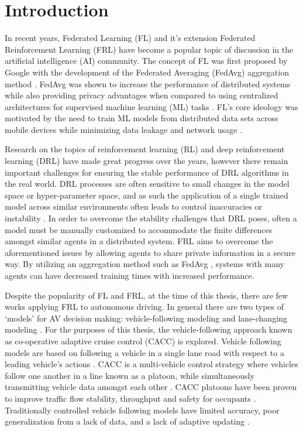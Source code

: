 \chapter{Introduction}
In recent years, Federated Learning (FL) and it's extension Federated Reinforcement Learning
(FRL) have become a popular topic of discussion in the artificial intelligence (AI)
community.  The concept of FL was first proposed by Google with the development of the
Federated Averaging (FedAvg) aggregation method \cite{McMahan2016FederatedLO}.
FedAvg was shown to increase the performance of distributed systems while also providing
privacy advantages when compared to using centralized architectures for supervised machine
learning (ML) tasks \cite{Konecny2015, BrendanMcMahan2017a, McMahan2016FederatedLO}.
FL's core ideology was motivated by the need to train ML models from distributed data sets
across mobile devices while minimizing data leakage and network usage
\cite{McMahan2016FederatedLO}.

Research on the topics of reinforcement learning (RL) and deep reinforcement learning (DRL)
have made great progress over the years, however there remain important challenges for
ensuring the stable performance of DRL algorithms in the real world. DRL processes are
often sensitive to small changes in the model space or hyper-parameter space, and as such
the application of a single trained model across similar environments often leads to control
inaccuracies or instability \cite{Yang2019a, Lim2020}.   In order to overcome the
stability challenges that DRL poses, often a model must be manually customized to
accommodate the finite differences amongst similar agents in a distributed system.
FRL aims to overcome the aforementioned issues by allowing agents to share private
information in a secure way.  By utilizing an aggregation method such as FedAvg
\cite{McMahan2016FederatedLO}, systems with many agents can have decreased training
times with increased performance.

Despite the popularity of FL and FRL, at the time of this thesis, there are few works applying FRL to autonomous
driving.  In general there are two types of `models' for AV decision making:
vehicle-following modeling and lane-changing modeling \cite{Ye2019}. For the purposes of
this thesis, the vehicle-following approach known as co-operative adaptive cruise control
(CACC) is explored. Vehicle following models are based on following a vehicle in a single
lane road with respect to a leading vehicle's actions \cite{Zhu2018}.  CACC is a
multi-vehicle control strategy where vehicles follow one another in a line known as a
platoon, while simultaneously transmitting vehicle data amongst each other \cite{Song2020}.
CACC platoons have been proven to improve traffic flow stability, throughput and safety
for occupants \cite{Song2020, Chu2019b}.  Traditionally controlled vehicle following
models have limited accuracy, poor generalization from a lack of data, and a lack of
adaptive updating \cite{Zhu2018}.

